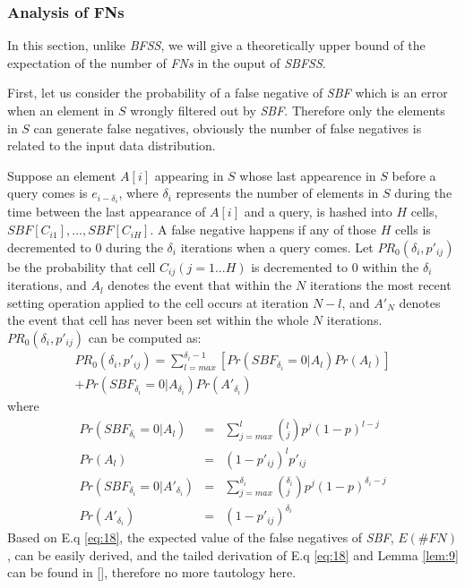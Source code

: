 \documentclass[conference]{IEEEtran}
\begin{document}
\subsubsection{\textbf{Analysis of FNs}}
In this section, unlike \emph{BFSS}, we will give a theoretically upper bound of the expectation of the number of \emph{FNs} in the ouput of \emph{SBFSS}. \par
First, let us consider the probability of a false negative of \emph{SBF} which is an error when an element in $S$ wrongly filtered out by \emph{SBF}. Therefore only the elements in $S$ can generate false negatives, obviously the number of false negatives is related to the input data distribution.\par
Suppose an element $A[i]$ appearing in $S$ whose last appearence in $S$ before a query comes is $e_{i-\delta_i}$, where $\delta_i$ represents the number of elements in $S$ during the time between the last appearance of $A[i]$ and a query, is hashed into $H$ cells, $SBF[C_{i1}],...,SBF[C_{iH}]$. A false negative happens if any of those $H$ cells is decremented to 0 during the $\delta_i$ iterations when a query comes. Let $PR_0(\delta_i,p'_{ij})$ be the probability that cell $C_{ij} (j = 1...H)$ is decremented to 0 within the $\delta_i$ iterations, and $A_l$ denotes the event that within the $N$ iterations the most recent setting operation applied to the cell occurs at iteration $N-l$, and $A'_N$ denotes the event that cell has never been set within the whole $N$ iterations. $PR_0(\delta_i,p'_{ij})$ can be computed as:
\begin{equation}\label{eq:18}
\begin{split}
PR_0(\delta_i,p'_{ij})=\sum_{l=max}^{\delta_i-1}[Pr(SBF_{\delta_i}=0|A_l)Pr(A_l)]\\
+Pr(SBF_{\delta_i}=0|A_{\delta_i})Pr(A'_{\delta_i})
\end{split}
\end{equation}
where 
\begin{eqnarray}\label{eq:19}
Pr(SBF_{\delta_i}=0|A_l)&=&\sum_{j=max}^{l}\left(^l_j\right)p^j(1-p)^{l-j}\\
Pr(A_l)&=&(1-p'_{ij})^lp'_{ij}\\
Pr(SBF_{\delta_i}=0|A'_{\delta_i})&=&\sum_{j=max}^{\delta_i}\left(^{\delta_i}_j\right)p^j(1-p)^{\delta_i-j}\\
Pr(A'_{\delta_i})&=&(1-p'_{ij})^{\delta_i}
\end{eqnarray}
Based on E.q \ref{eq:18}, the expected value of the false negatives of \emph{SBF}, $E(\#FN)$, can be easily derived, and the tailed derivation of E.q \ref{eq:18} and Lemma \ref{lem:9} can be found in [], therefore no more tautology here.\par
\end{document}
